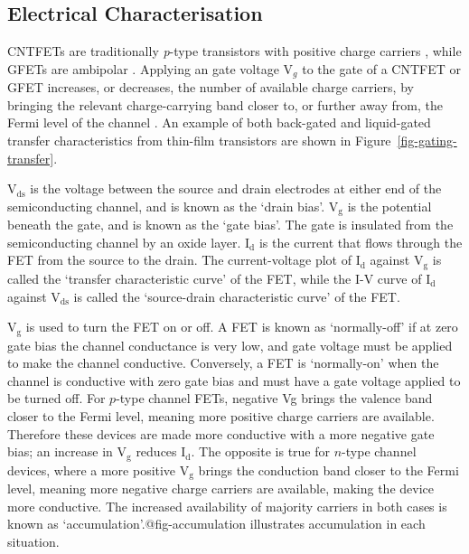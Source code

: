 \documentclass[
  a4paper,
]{scrbook}
\begin{document}
\hypertarget{electrical-characterisation}{%
\subsection{Electrical
Characterisation}\label{electrical-characterisation}}

CNTFETs are traditionally \emph{p}-type transistors with positive charge
carriers \autocite{Martel1998,Kong2000}, while GFETs are ambipolar
\autocite{Ohno2010a}. Applying an gate voltage V\(_g\) to the gate of a
CNTFET or GFET increases, or decreases, the number of available charge
carriers, by bringing the relevant charge-carrying band closer to, or
further away from, the Fermi level of the channel \autocite{Sze2006}. An
example of both back-gated and liquid-gated transfer characteristics
from thin-film transistors are shown in
Figure~\ref{fig-gating-transfer}.

V\(_\textrm{ds}\) is the voltage between the source and drain electrodes
at either end of the semiconducting channel, and is known as the `drain
bias'. V\(_\textrm{g}\) is the potential beneath the gate, and is known
as the `gate bias'. The gate is insulated from the semiconducting
channel by an oxide layer. I\(_\textrm{d}\) is the current that flows
through the FET from the source to the drain. The current-voltage plot
of I\(_\textrm{d}\) against V\(_\textrm{g}\) is called the `transfer
characteristic curve' of the FET, while the I-V curve of
I\(_\textrm{d}\) against V\(_\textrm{ds}\) is called the `source-drain
characteristic curve' of the FET.

V\(_\textrm{g}\) is used to turn the FET on or off. A FET is known as
`normally-off' if at zero gate bias the channel conductance is very low,
and gate voltage must be applied to make the channel conductive.
Conversely, a FET is `normally-on' when the channel is conductive with
zero gate bias and must have a gate voltage applied to be turned off.
For \(p\)-type channel FETs, negative Vg brings the valence band closer
to the Fermi level, meaning more positive charge carriers are available.
Therefore these devices are made more conductive with a more negative
gate bias; an increase in V\(_\textrm{g}\) reduces I\(_\textrm{d}\). The
opposite is true for \(n\)-type channel devices, where a more positive
V\(_\textrm{g}\) brings the conduction band closer to the Fermi level,
meaning more negative charge carriers are available, making the device
more conductive. The increased availability of majority carriers in both
cases is known as `accumulation'.@fig-accumulation illustrates
accumulation in each situation.
\end{document}
